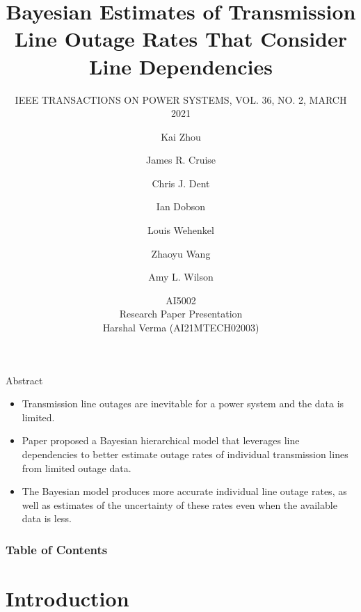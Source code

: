 \documentclass{beamer}
\title[Bayesian Estimates of Transmission Line]{Bayesian Estimates of Transmission Line Outage
Rates That Consider Line Dependencies}
\subtitle{IEEE TRANSACTIONS ON POWER SYSTEMS, VOL. 36, NO. 2, MARCH 2021}
\author[Kai Zhou, Zhaoyu Wang, Ian Dobson]
{Kai Zhou \and  James R. Cruise \and  Chris J. Dent  \and  Ian Dobson \and  Louis Wehenkel \and Zhaoyu Wang \and Amy L. Wilson }
\date[\today]
{AI5002\\ Research Paper Presentation\\ Harshal Verma (AI21MTECH02003)}
\begin{document}
\frame{\titlepage}
\begin{frame}{Abstract}
\begin{block}

\begin{itemize}
    \item Transmission line outages are inevitable for a power system and  the data is limited.
    \item Paper proposed a Bayesian hierarchical model that leverages line dependencies to better estimate outage rates of individual transmission lines from limited outage data.
    \item The Bayesian model produces more accurate individual line outage rates, as well as estimates of the uncertainty of these rates even when the available data is less.
    
\end{itemize}
\end{block}
\end{frame}

\begin{frame}
\frametitle{Table of Contents}
\tableofcontents
\end{frame}



\section{Introduction}
\end{document}
